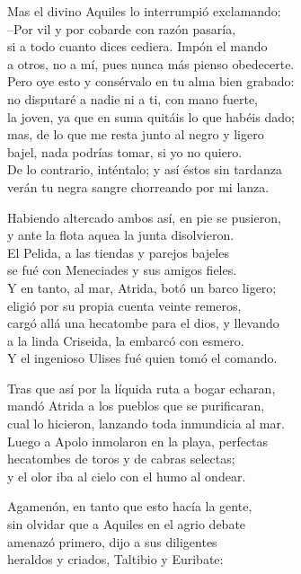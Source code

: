 Mas el divino Aquiles lo interrumpió exclamando:\\
--Por vil y por cobarde con razón pasaría,\\
si a todo cuanto dices cediera. Impón el mando\\
a otros, no a mí, pues nunca más pienso obedecerte.\\
Pero oye esto y consérvalo en tu alma bien grabado:\\
no disputaré a nadie ni a ti, con mano fuerte,\\
la joven, ya que en suma quitáis lo que habéis dado;\\
mas, de lo que me resta junto al negro y ligero\\
bajel, nada podrías tomar, si yo no quiero.\\
De lo contrario, inténtalo; y así éstos sin tardanza\\
verán tu negra sangre chorreando por mi lanza.\par
Habiendo altercado ambos así, en pie se pusieron,\\
y ante la flota aquea la junta disolvieron.\\
El Pelida, a las tiendas y parejos bajeles\\
se fué con Meneciades y sus amigos fieles.\\
Y en tanto, al mar, Atrida, botó un barco ligero;\\
eligió por su propia cuenta veinte remeros,\\
cargó allá una hecatombe para el dios, y llevando\\
a la linda Criseida, la embarcó con esmero.\\
Y el ingenioso Ulises fué quien tomó el comando.\par
Tras que así por la líquida ruta a bogar echaran,\\
mandó Atrida a los pueblos que se purificaran,\\
cual lo hicieron, lanzando toda inmundicia al mar.\\
Luego a Apolo inmolaron en la playa, perfectas\\
hecatombes de toros y de cabras selectas;\\
y el olor iba al cielo con el humo al ondear.\par
Agamenón, en tanto que esto hacía la gente,\\
sin olvidar que a Aquiles en el agrio debate\\
amenazó primero, dijo a sus diligentes\\
heraldos y criados, Taltibio y Euribate:\par
